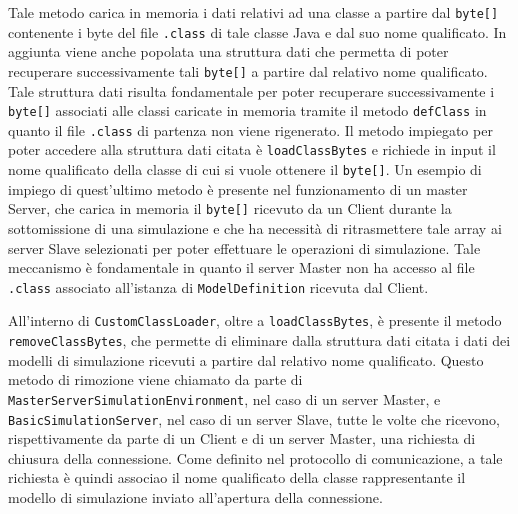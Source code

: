 Tale metodo carica in memoria i dati relativi ad una classe a partire dal \texttt{byte[]} contenente i byte del file \texttt{.class} di tale classe Java e dal suo nome qualificato. In aggiunta viene anche popolata una struttura dati che permetta di poter recuperare successivamente tali \texttt{byte[]} a partire dal relativo nome qualificato. Tale struttura dati risulta fondamentale per poter recuperare successivamente i \texttt{byte[]} associati alle classi caricate in memoria tramite il metodo \texttt{defClass} in quanto il file \texttt{.class} di partenza non viene rigenerato. Il metodo impiegato per poter accedere alla struttura dati citata è \texttt{loadClassBytes} e richiede in input il nome qualificato della classe di cui si vuole ottenere il \texttt{byte[]}. Un esempio di impiego di quest'ultimo metodo è presente nel funzionamento di un master Server, che carica in memoria il \texttt{byte[]} ricevuto da un Client durante la sottomissione di una simulazione e che ha necessità di ritrasmettere tale array ai server Slave selezionati per poter effettuare le operazioni di simulazione. Tale meccanismo è fondamentale in quanto il server Master non ha accesso al file \texttt{.class} associato all'istanza di \texttt{ModelDefinition} ricevuta dal Client.

All'interno di \texttt{CustomClassLoader}, oltre a \texttt{loadClassBytes}, è presente il metodo \texttt{removeClassBytes}, che permette di eliminare dalla struttura dati citata i dati dei modelli di simulazione ricevuti a partire dal relativo nome qualificato. Questo metodo di rimozione viene chiamato da parte di \texttt{MasterServerSimulationEnvironment}, nel caso di un server Master, e \texttt{BasicSimulationServer}, nel caso di un server Slave, tutte le volte che ricevono, rispettivamente da parte di un Client e di un server Master, una richiesta di chiusura della connessione. Come definito nel protocollo di comunicazione, a tale richiesta è quindi associao il nome qualificato della classe rappresentante il modello di simulazione inviato all'apertura della connessione.